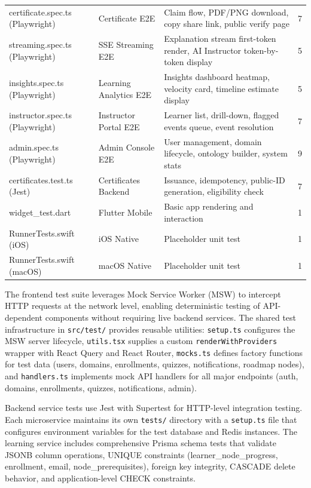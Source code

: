 \begin{longtable}{p{3cm}p{3.5cm}p{5cm}p{1.5cm}}
certificate.spec.ts (Playwright) & Certificate E2E & Claim flow, PDF/PNG download, copy share link, public verify page & 7 \\
streaming.spec.ts (Playwright) & SSE Streaming E2E & Explanation stream first-token render, AI Instructor token-by-token display & 5 \\
insights.spec.ts (Playwright) & Learning Analytics E2E & Insights dashboard heatmap, velocity card, timeline estimate display & 5 \\
instructor.spec.ts (Playwright) & Instructor Portal E2E & Learner list, drill-down, flagged events queue, event resolution & 7 \\
admin.spec.ts (Playwright) & Admin Console E2E & User management, domain lifecycle, ontology builder, system stats & 9 \\
certificates.test.ts (Jest) & Certificates Backend & Issuance, idempotency, public-ID generation, eligibility check & 7 \\
widget\_test.dart & Flutter Mobile & Basic app rendering and interaction & 1 \\
RunnerTests.swift (iOS) & iOS Native & Placeholder unit test & 1 \\
RunnerTests.swift (macOS) & macOS Native & Placeholder unit test & 1 \\
\bottomrule
\end{longtable}

The frontend test suite leverages Mock Service Worker (MSW) to intercept HTTP requests at the network level, enabling deterministic testing of API-dependent components without requiring live backend services. The shared test infrastructure in \texttt{src/test/} provides reusable utilities: \texttt{setup.ts} configures the MSW server lifecycle, \texttt{utils.tsx} supplies a custom \texttt{renderWithProviders} wrapper with React Query and React Router, \texttt{mocks.ts} defines factory functions for test data (users, domains, enrollments, quizzes, notifications, roadmap nodes), and \texttt{handlers.ts} implements mock API handlers for all major endpoints (auth, domains, enrollments, quizzes, notifications, admin).

Backend service tests use Jest with Supertest for HTTP-level integration testing. Each microservice maintains its own \texttt{tests/} directory with a \texttt{setup.ts} file that configures environment variables for the test database and Redis instances. The learning service includes comprehensive Prisma schema tests that validate JSONB column operations, UNIQUE constraints (learner\_node\_progress, enrollment, email, node\_prerequisites), foreign key integrity, CASCADE delete behavior, and application-level CHECK constraints.

